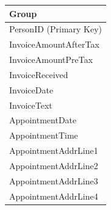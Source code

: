 \begin{flushleft}
\begin{longtable}{|p{12cm}|}
			\textbf{Group} \\ \hline
			PersonID (Primary Key) \\
			InvoiceAmountAfterTax \\
			InvoiceAmountPreTax \\
			InvoiceReceived \\
			InvoiceDate \\
			InvoiceText \\
			AppointmentDate \\
			AppointmentTime \\
			AppointmentAddrLine1 \\
			AppointmentAddrLine2 \\
			AppointmentAddrLine3	\\
			AppointmentAddrLine4 \\ \hline


    \end{longtable}
\end{flushleft}
